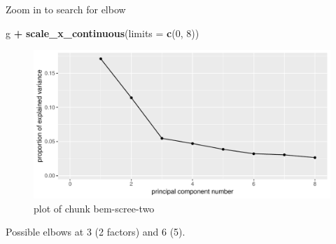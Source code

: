 \documentclass[ignorenonframetext,]{beamer}
\newenvironment{Shaded}{\begin{snugshade}}{\end{snugshade}}
\newcommand{\DataTypeTok}[1]{\textcolor[rgb]{0.13,0.29,0.53}{#1}}
\newcommand{\DecValTok}[1]{\textcolor[rgb]{0.00,0.00,0.81}{#1}}
\newcommand{\KeywordTok}[1]{\textcolor[rgb]{0.13,0.29,0.53}{\textbf{#1}}}
\newcommand{\NormalTok}[1]{#1}
\newcommand{\OperatorTok}[1]{\textcolor[rgb]{0.81,0.36,0.00}{\textbf{#1}}}
\newcommand{\StringTok}[1]{\textcolor[rgb]{0.31,0.60,0.02}{#1}}
\begin{document}
\begin{frame}[fragile]{Zoom in to search for elbow}
\protect\hypertarget{zoom-in-to-search-for-elbow}{}

\begin{Shaded}
\begin{Highlighting}[]
\NormalTok{g }\OperatorTok{+}\StringTok{ }\KeywordTok{scale_x_continuous}\NormalTok{(}\DataTypeTok{limits =} \KeywordTok{c}\NormalTok{(}\DecValTok{0}\NormalTok{, }\DecValTok{8}\NormalTok{))}
\end{Highlighting}
\end{Shaded}

\begin{figure}
\centering
\includegraphics{figure/bem-scree-two-1.pdf}
\caption{plot of chunk bem-scree-two}
\end{figure}

Possible elbows at 3 (2 factors) and 6 (5).

\end{frame}
\end{document}
